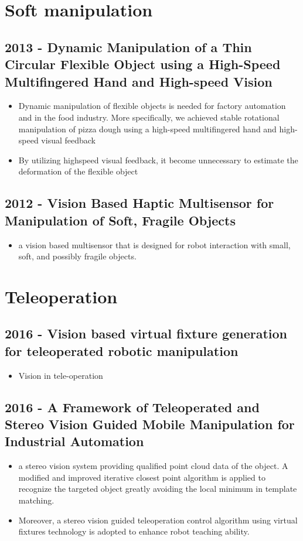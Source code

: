 \section{Soft manipulation}
\subsection{2013 - Dynamic Manipulation of a Thin Circular Flexible Object using a High-Speed Multifingered Hand and High-speed Vision}
\begin{itemize}
\item Dynamic manipulation of flexible objects is needed
for factory automation and in the food industry. More specifically, we achieved stable rotational manipulation of pizza dough using a high-speed multifingered hand and high-speed visual feedback
\item  By utilizing highspeed visual feedback, it become unnecessary to estimate the deformation of the flexible object
\end{itemize}

\subsection{2012 - Vision Based Haptic Multisensor for Manipulation of Soft, Fragile Objects}
\begin{itemize}
\item a vision based multisensor that is designed for robot interaction with small, soft, and possibly fragile objects. 
\end{itemize}


\section{Teleoperation}
\subsection{2016 - Vision based virtual fixture generation for teleoperated robotic manipulation}
\begin{itemize}
\item Vision in tele-operation 
\end{itemize}

\subsection{2016 - A Framework of Teleoperated and Stereo Vision Guided Mobile Manipulation for Industrial Automation}
\begin{itemize}
\item  a stereo vision system providing qualified point cloud data of the object. A modified and improved iterative closest point algorithm is applied to recognize the targeted object greatly avoiding the local minimum in template matching.
\item Moreover, a stereo vision guided teleoperation control algorithm using virtual fixtures technology is adopted to enhance robot teaching ability.
\end{itemize}

